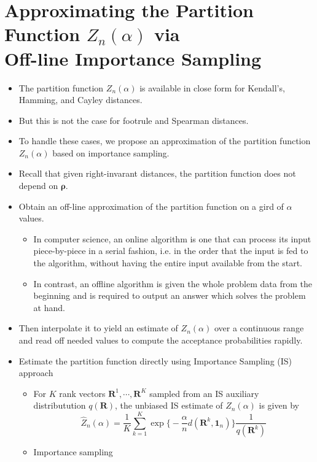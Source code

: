 \documentclass[12pt]{article}
\begin{document}
\section{Approximating the Partition Function $Z_n(\alpha)$ via \\Off-line Importance Sampling}
\begin{itemize}
    \item The partition function $Z_n(\alpha)$ is available in close form for Kendall's, Hamming, and Cayley distances.
    \item But this is not the case for footrule and Spearman distances.
    \item To handle these cases, we propose an approximation of the partition function $Z_n(\alpha)$ based on importance sampling. 
    \item Recall that given right-invarant distances, the partition function does not depend on $\boldsymbol{\rho}$. 
    \item Obtain an off-line approximation of the partition function on a gird of $\alpha$ values. 
    \begin{itemize}
        \item In computer science, an online algorithm is one that can process its input piece-by-piece in a serial fashion, i.e. in the order that the input is fed to the algorithm, without having the entire input available from the start.
        \item In contrast, an offline algorithm is given the whole problem data from the beginning and is required to output an answer which solves the problem at hand. 
    \end{itemize}
    \item Then interpolate it to yield an estimate of $Z_n(\alpha)$ over a continuous range and read off needed values to compute the acceptance probabilities rapidly.
    \item Estimate the partition function directly using Importance Sampling (IS) approach
    \begin{itemize}
        \item For $K$ rank vectors $\mathbf{R}^1,\cdots, \mathbf{R}^K$ sampled from an IS auxiliary distributution $q(\mathbf{R})$, the unbiased IS estimate of $Z_n(\alpha)$ is given by \begin{equation}
            \hat{Z}_n(\alpha)=\frac{1}{K}\sum_{k=1}^K \exp\big\{-\frac{\alpha}{n}d(\mathbf{R}^k, \mathbf{1}_n) \big\}\frac{1}{q(\mathbf{R}^k)}
        \end{equation} 
        \item Importance sampling

\end{itemize}
\end{itemize}
\end{document}
